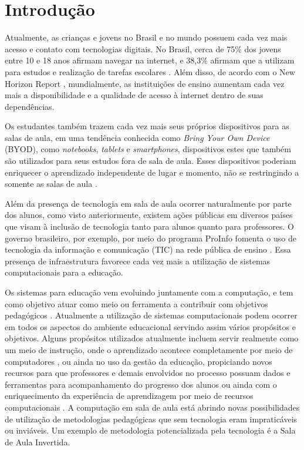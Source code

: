 \chapter{Introdução}
\label{cap:introducao}

Atualmente, as crianças e jovens no Brasil e no mundo possuem cada vez mais acesso e contato
com tecnologias digitais. No Brasil, cerca de 75\% dos jovens entre 10 e 18 anos afirmam navegar na internet, e 38,3\% afirmam que a utilizam para estudos e realização de tarefas escolares \cite{escola_futuro:2012}. Além disso, de acordo com o New Horizon Report \cite{horizon:2012}, mundialmente, as instituições de ensino aumentam cada vez mais a disponibilidade e a qualidade de acesso à internet dentro de suas dependências.

Os estudantes também trazem cada vez mais seus próprios dispositivos para as salas de aula, em uma tendência conhecida como \emph{Bring Your Own Device} (BYOD), como \emph{notebooks}, \emph{tablets} e \emph{smartphones}, dispositivos estes que também são utilizados para seus estudos fora de sala de aula. Esses dispositivos poderiam enriquecer o aprendizado independente de lugar e momento, não se restringindo a somente as salas de aula \cite{horizon_k12:2014}. 



Além da presença de tecnologia em sala de aula ocorrer naturalmente por parte dos alunos, como visto anteriormente, existem ações públicas em diversos países que visam à inclusão de tecnologia tanto para alunos quanto para professores. O governo brasileiro, por exemplo, por meio do programa ProInfo fomenta o uso de tecnologia da informação e comunicação (TIC) na rede pública de ensino \cite{proinfo}. Essa presença de infraestrutura favorece cada vez mais a utilização de sistemas computacionais para a educação.

Os sistemas para educação vem evoluindo juntamente com a computação, e tem como objetivo atuar como meio ou ferramenta a contribuir com objetivos pedagógicos \cite{tchounikine11}. Atualmente a utilização de sistemas computacionais podem ocorrer em todos os aspectos do ambiente educacional servindo assim vários propósitos e objetivos. Alguns propósitos utilizados atualmente incluem servir realmente como um meio de instrução, onde o aprendizado acontece completamente por meio de computadores \cite{mlearning09}, ou ainda no uso da gestão da educação, propiciando novos recursos para que professores e demais envolvidos no processo possuam dados e ferramentas para acompanhamento do progresso dos alunos \cite{flescher02} ou ainda com o enriquecimento da experiência de aprendizagem por meio de recursos computacionais \cite{cotton91}. A computação em sala de aula está abrindo novas possibilidades de utilização de metodologias pedagógicas que sem tecnologia eram impraticáveis ou inviáveis. Um exemplo de metodologia potencializada pela tecnologia é a Sala de Aula Invertida. 

